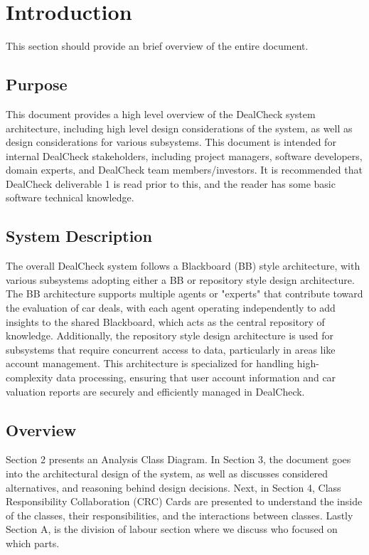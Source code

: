 \documentclass[]{article}
\begin{document}
\newpage
\section{Introduction}
\label{sec:introduction}

This section should provide an brief overview of the entire document.

\subsection{Purpose}
\label{sub:purpose}
This document provides a high level overview of the DealCheck system architecture, including high level design considerations of the system, as well as design considerations for various subsystems. This document is intended for internal DealCheck stakeholders, including project managers, software developers, domain experts, and DealCheck team members/investors. It is recommended that DealCheck deliverable 1 is read prior to this, and the reader has some basic software technical knowledge.

\subsection{System Description}
\label{sub:system_description}
The overall DealCheck system follows a Blackboard (BB) style architecture, with various subsystems adopting either a BB or repository style design architecture.
The BB architecture supports multiple agents or "experts" that contribute toward the evaluation of car deals, with each agent operating independently to add insights to the shared Blackboard, which acts as the central repository of knowledge.
Additionally, the repository style design architecture is used for subsystems that require concurrent access to data, particularly in areas like account management. This architecture is specialized for handling high-complexity data processing, ensuring that user account information and car valuation reports are securely and efficiently managed in DealCheck.

\subsection{Overview}
\label{sub:overview}
Section 2 presents an Analysis Class Diagram. In Section 3, the document goes into the architectural design of the system, as well as discusses considered alternatives, and reasoning behind design decisions. Next, in Section 4, Class Responsibility Collaboration (CRC) Cards are presented to understand the inside of the classes, their responsibilities, and the interactions between classes. Lastly Section A, is the division of labour section where we discuss who focused on which parts.
\end{document}
